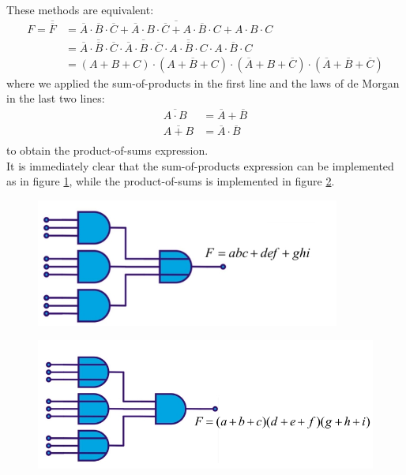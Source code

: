 These methods are equivalent: 
\begin{align*}
	F = \overline{\overline{F}} &= \overline{\overline{A} \cdot \overline{B}  \cdot  \overline{C} + \overline{A} \cdot  B  \cdot  \overline{C} + A  \cdot \overline{B}  \cdot C + A  \cdot B  \cdot C } \\
			&= \overline{\overline{A} \cdot \overline{B}  \cdot  \overline{C}} \cdot \overline{\overline{A} \cdot  B  \cdot  \overline{C}} \cdot \overline{A  \cdot \overline{B}  \cdot C} \cdot \overline{A  \cdot B  \cdot C } \\
			&= (A + B + C) \cdot (A + \overline{B} + C) \cdot (\overline{A} + B + \overline{C}) \cdot (\overline{A} + \overline{B} + \overline{C})
\end{align*}
where we applied the sum-of-products in the first line and the laws of de Morgan in the last two lines:
\begin{align*}
	\overline{A \cdot B} &= \overline{A} + \overline{B} \\
	\overline{A + B} &= \overline{A} \cdot \overline{B} \\
\end{align*}
to obtain the product-of-sums expression.\\
It is immediately clear that the sum-of-products expression can be implemented as in figure \ref{fig:combinatorial1}, while the product-of-sums is implemented in figure \ref{fig:combinatorial2}.

\begin{figure}[h!]
	\centering
	\includegraphics[width=10cm]{figures/ch13/combinatorial1.jpg}
	\caption{}
	\label{fig:combinatorial1}
\end{figure}

\begin{figure}[h!]
	\centering
	\includegraphics[width=12cm]{figures/ch13/combinatorial2.jpg}
	\caption{}
	\label{fig:combinatorial2}
\end{figure}

